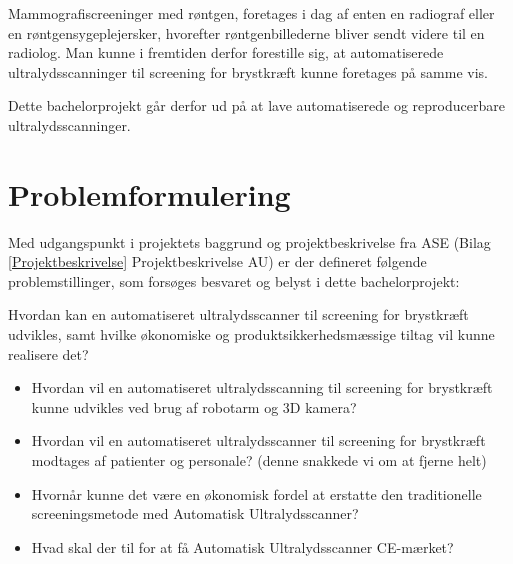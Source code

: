 Mammografiscreeninger med røntgen, foretages i dag af enten en radiograf eller en røntgensygeplejersker, hvorefter røntgenbillederne bliver sendt videre til en radiolog. Man kunne i fremtiden derfor forestille sig, at automatiserede ultralydsscanninger til screening for brystkræft kunne foretages på samme vis.

Dette bachelorprojekt går derfor ud på at lave automatiserede og reproducerbare ultralydsscanninger.

\section{Problemformulering}
Med udgangspunkt i projektets baggrund og projektbeskrivelse fra ASE (Bilag \ref{Projektbeskrivelse} Projektbeskrivelse AU) er der defineret følgende problemstillinger, som forsøges besvaret og belyst i dette bachelorprojekt:

Hvordan kan en automatiseret ultralydsscanner til screening for brystkræft udvikles, samt hvilke økonomiske og produktsikkerhedsmæssige tiltag vil kunne realisere det?

\let\labelitemi\labelitemii
\begin{itemize}
\item Hvordan vil en automatiseret ultralydsscanning til screening for brystkræft kunne udvikles ved brug af robotarm og 3D kamera?
\item Hvordan vil en automatiseret ultralydsscanner til screening for brystkræft modtages af patienter og personale? (denne snakkede vi om at fjerne helt) 
\item Hvornår kunne det være en økonomisk fordel at erstatte den traditionelle screeningsmetode med Automatisk Ultralydsscanner?
\item Hvad skal der til for at få Automatisk Ultralydsscanner CE-mærket? 
\end{itemize}